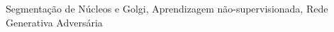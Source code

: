 \acresetall

\noindent Segmentação de Núcleos e Golgi, Aprendizagem não-supervisionada, Rede Generativa Adversária